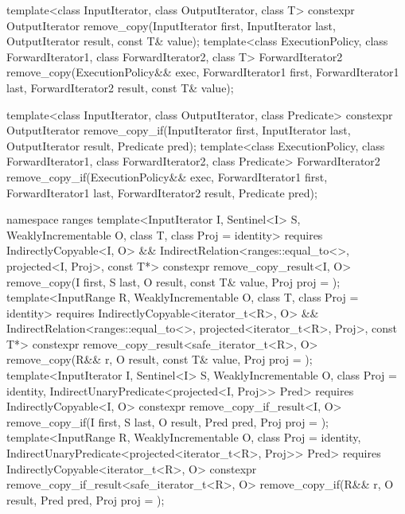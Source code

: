 %
%
\begin{itemdecl}
template<class InputIterator, class OutputIterator, class T>
  constexpr OutputIterator
    remove_copy(InputIterator first, InputIterator last,
                OutputIterator result, const T& value);
template<class ExecutionPolicy, class ForwardIterator1, class ForwardIterator2,
         class T>
  ForwardIterator2
    remove_copy(ExecutionPolicy&& exec,
                ForwardIterator1 first, ForwardIterator1 last,
                ForwardIterator2 result, const T& value);

template<class InputIterator, class OutputIterator, class Predicate>
  constexpr OutputIterator
    remove_copy_if(InputIterator first, InputIterator last,
                   OutputIterator result, Predicate pred);
template<class ExecutionPolicy, class ForwardIterator1, class ForwardIterator2,
         class Predicate>
  ForwardIterator2
    remove_copy_if(ExecutionPolicy&& exec,
                   ForwardIterator1 first, ForwardIterator1 last,
                   ForwardIterator2 result, Predicate pred);

namespace ranges {
  template<InputIterator I, Sentinel<I> S, WeaklyIncrementable O, class T,
      class Proj = identity>
    requires IndirectlyCopyable<I, O> &&
      IndirectRelation<ranges::equal_to<>, projected<I, Proj>, const T*>
    constexpr remove_copy_result<I, O>
      remove_copy(I first, S last, O result, const T& value, Proj proj = {});
  template<InputRange R, WeaklyIncrementable O, class T, class Proj = identity>
    requires IndirectlyCopyable<iterator_t<R>, O> &&
      IndirectRelation<ranges::equal_to<>, projected<iterator_t<R>, Proj>, const T*>
    constexpr remove_copy_result<safe_iterator_t<R>, O>
      remove_copy(R&& r, O result, const T& value, Proj proj = {});
  template<InputIterator I, Sentinel<I> S, WeaklyIncrementable O,
      class Proj = identity, IndirectUnaryPredicate<projected<I, Proj>> Pred>
    requires IndirectlyCopyable<I, O>
    constexpr remove_copy_if_result<I, O>
      remove_copy_if(I first, S last, O result, Pred pred, Proj proj = {});
  template<InputRange R, WeaklyIncrementable O, class Proj = identity,
      IndirectUnaryPredicate<projected<iterator_t<R>, Proj>> Pred>
    requires IndirectlyCopyable<iterator_t<R>, O>
    constexpr remove_copy_if_result<safe_iterator_t<R>, O>
      remove_copy_if(R&& r, O result, Pred pred, Proj proj = {});
}
\end{itemdecl}

